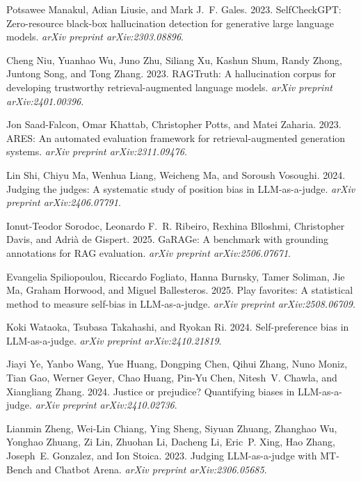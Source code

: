\documentclass[11pt]{article}
\begin{document}
\begin{thebibliography}{}
Potsawee Manakul, Adian Liusie, and Mark J.~F. Gales. 2023.
\newblock SelfCheckGPT: Zero-resource black-box hallucination detection for generative large language models.
\newblock \emph{arXiv preprint arXiv:2303.08896}.

Cheng Niu, Yuanhao Wu, Juno Zhu, Siliang Xu, Kashun Shum, Randy Zhong, Juntong Song, and Tong Zhang. 2023.
\newblock RAGTruth: A hallucination corpus for developing trustworthy retrieval-augmented language models.
\newblock \emph{arXiv preprint arXiv:2401.00396}.

Jon Saad-Falcon, Omar Khattab, Christopher Potts, and Matei Zaharia. 2023.
\newblock ARES: An automated evaluation framework for retrieval-augmented generation systems.
\newblock \emph{arXiv preprint arXiv:2311.09476}.

Lin Shi, Chiyu Ma, Wenhua Liang, Weicheng Ma, and Soroush Vosoughi. 2024.
\newblock Judging the judges: A systematic study of position bias in LLM-as-a-judge.
\newblock \emph{arXiv preprint arXiv:2406.07791}.

Ionut-Teodor Sorodoc, Leonardo F.~R. Ribeiro, Rexhina Blloshmi, Christopher Davis, and Adri{\`a} de Gispert. 2025.
\newblock GaRAGe: A benchmark with grounding annotations for RAG evaluation.
\newblock \emph{arXiv preprint arXiv:2506.07671}.

Evangelia Spiliopoulou, Riccardo Fogliato, Hanna Burnsky, Tamer Soliman, Jie Ma, Graham Horwood, and Miguel Ballesteros. 2025.
\newblock Play favorites: A statistical method to measure self-bias in LLM-as-a-judge.
\newblock \emph{arXiv preprint arXiv:2508.06709}.

Koki Wataoka, Tsubasa Takahashi, and Ryokan Ri. 2024.
\newblock Self-preference bias in LLM-as-a-judge.
\newblock \emph{arXiv preprint arXiv:2410.21819}.

Jiayi Ye, Yanbo Wang, Yue Huang, Dongping Chen, Qihui Zhang, Nuno Moniz, Tian Gao, Werner Geyer, Chao Huang, Pin-Yu Chen, Nitesh~V. Chawla, and Xiangliang Zhang. 2024.
\newblock Justice or prejudice? Quantifying biases in LLM-as-a-judge.
\newblock \emph{arXiv preprint arXiv:2410.02736}.

Lianmin Zheng, Wei-Lin Chiang, Ying Sheng, Siyuan Zhuang, Zhanghao Wu, Yonghao Zhuang, Zi Lin, Zhuohan Li, Dacheng Li, Eric~P. Xing, Hao Zhang, Joseph~E. Gonzalez, and Ion Stoica. 2023.
\newblock Judging LLM-as-a-judge with MT-Bench and Chatbot Arena.
\newblock \emph{arXiv preprint arXiv:2306.05685}.

\end{thebibliography}
\end{document}
